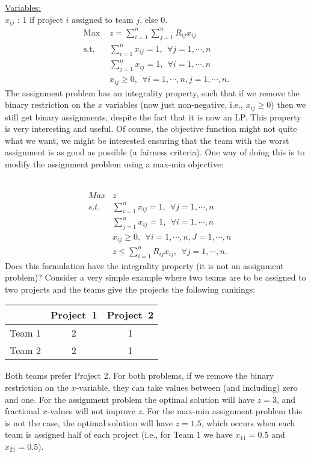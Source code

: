 \smallskip \underline{Variables:} \\
$x_{ij}$ : 1 if project $i$ assigned to team $j$, else 0.
\begin{align*}
\mbox{Max~}   & z = \sum_{i=1}^{n}\sum_{j=1}^{n} R_{ij} x_{ij}  \\
\mbox{s.t.~}& \sum_{i=1}^{n} x_{ij} = 1,~~ \forall j = 1,\cdots,n  \\
& \sum_{j=1}^{n} x_{ij} = 1,~~ \forall i = 1,\cdots,n  \\
& x_{ij} \ge 0,~~ \forall i = 1,\cdots,n, j = 1,\cdots,n. 
\end{align*}
The assignment problem has an integrality property, such that if we remove the binary restriction on the $x$ variables (now just non-negative, i.e., $x_{ij} \ge 0$) then we still get binary assignments, despite the fact that it is now an LP.  This property is very interesting and useful. Of course, the objective function might not quite what we want, we might be interested ensuring that the team with the worst assignment is as good as possible (a fairness criteria). One way of doing this is to modify the assignment problem using a max-min objective:

 \\
\begin{eqnarray}
& Max  & z  \nonumber \\
& s.t. & \sum_{i=1}^{n} x_{ij} = 1,~~ \forall j = 1,\cdots,n \nonumber \\
&      & \sum_{j=1}^{n} x_{ij} = 1,~~ \forall i = 1,\cdots,n \nonumber \\
&      & x_{ij} \ge 0,~~ \forall i = 1,\cdots,n, J = 1,\cdots,n \nonumber \\
&      & z \le \sum_{i=1}^{n} R_{ij} x_{ij},~~ \forall j = 1,\cdots,n. \nonumber
\end{eqnarray}
Does this formulation have the integrality property (it is not an assignment problem)?  Consider a very simple example where two teams are to be assigned to two projects and the teams give the projects the following rankings:
\begin{table}[h!] \begin{center} \begin{tabular} {|c||c|c|}
\hline           & Project~1 & Project~2 \\ \hline \hline
\hline Team 1    & 2  & 1  \\
\hline Team 2    & 2  & 1 \\ \hline
\end{tabular} \end{center} \end{table}
Both teams prefer Project 2.  For both problems, if we remove the binary restriction on the
$x$-variable, they can take values between (and including) zero and one. For the assignment problem the optimal solution will have $z=3$, and fractional $x$-values will not improve $z$. For the max-min assignment problem this is not the case, the optimal solution will have $z=1.5$, which occurs when each team is assigned half of each project (i.e., for Team 1 we have $x_{11} = 0.5$ and $x_{21} = 0.5$).


